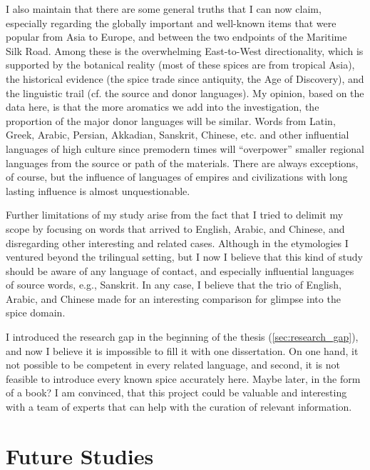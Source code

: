 I also maintain that there are some general truths that I can now claim, especially regarding the globally important and well-known items that were popular from Asia to Europe, and between the two endpoints of the Maritime Silk Road. Among these is the overwhelming East-to-West directionality, which is supported by the botanical reality (most of these spices are from tropical Asia), the historical evidence (the spice trade since antiquity, the Age of Discovery), and the linguistic trail (cf. the source and donor languages). My opinion, based on the data here, is that the more aromatics we add into the investigation, the proportion of the major donor languages will be similar. Words from Latin, Greek, Arabic, Persian, Akkadian, Sanskrit, Chinese, etc. and other influential languages of high culture since premodern times will ``overpower'' smaller regional languages from the source or path of the materials. There are always exceptions, of course, but the influence of languages of empires and civilizations with long lasting influence is almost unquestionable.

Further limitations of my study arise from the fact that I tried to delimit my scope by focusing on words that arrived to English, Arabic, and Chinese, and disregarding other interesting and related cases. Although in the etymologies I ventured beyond the trilingual setting, but I now I believe that this kind of study should be aware of any language of contact, and especially influential languages of source words, e.g., Sanskrit. In any case, I believe that the trio of English, Arabic, and Chinese made for an interesting comparison for glimpse into the spice domain.


I introduced the research gap in the beginning of the thesis (\cref{sec:research_gap}), and now I believe it is impossible to fill it with one dissertation. On one hand, it not possible to be competent in every related language, and second, it is not feasible to introduce every known spice accurately here. Maybe later, in the form of a book? I am convinced, that this project could be valuable and interesting with a team of experts that can help with the curation of relevant information.

\section{Future Studies}
\label{sec:future_study}

